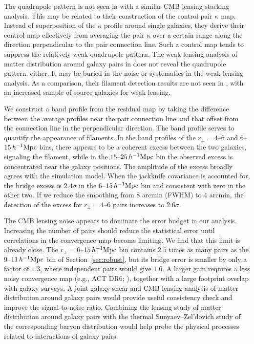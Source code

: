 \documentclass[twocolumn,anonymous,linenumbers]{aastex701}
\newcommand{\hinvMpc}{h^{-1}{\rm Mpc}}
\begin{document}
The quadrupole pattern is not seen in \citet{deGraaff2019} with a similar CMB lensing stacking analysis. This may be related to their construction of the control pair $\kappa$ map. Instead of superposition of the $\kappa$ profile around single galaxies, they derive their control map effectively from averaging the pair $\kappa$ over a certain range along the direction perpendicular to the pair connection line. Such a control map tends to suppress the relatively weak quadrupole pattern. The weak lensing analysis of matter distribution around galaxy pairs in \citet{EppsHudson2017} does not reveal the quadrupole pattern, either. It may be buried in the noise or systematics in the weak lensing analysis. As a comparison, their filament detection results are not seen in \citet{Xia2020}, with an increased sample of source galaxies for weak lensing.

We construct a band profile from the residual map by taking the difference between the average profiles near the pair connection line and that offset from the connection line in the perpendicular direction. The band profile serves to quantify the appearance of filaments. In the band profiles of the $r_\perp=4$--$6$ and $6$--$15\,\hinvMpc$ bins, there appears to be a coherent excess between the two galaxies, signaling the filament, while in the $15$--$25\,\hinvMpc$ bin the observed excess is concentrated near the galaxy positions. The amplitude of the excess broadly agrees with the simulation model. When the jackknife covariance is accounted for, the bridge excess is $2.4\sigma$ in the $6$--$15\,\hinvMpc$ bin and consistent with zero in the other two. If we reduce the smoothing from 8 arcmin (FWHM) to 4 arcmin, the detection of the excess for $r_\perp=4$--$6$ pairs increases to 2.6$\sigma$.

The CMB lensing noise appears to dominate the error budget in our analysis.
Increasing the number of pairs
should reduce the statistical error until correlations in the convergence
map become limiting. We find that this limit is already close. The
$r_\perp=6$--$15\,\hinvMpc$ bin contains $2.5$ times as many pairs as the
$9$--$11\,\hinvMpc$ bin of Section~\ref{sec:robust}, but its bridge error is
smaller by only a factor of $1.3$, where independent pairs would give $1.6$.
A larger gain requires a less noisy convergence map (e.g., ACT DR6; \citealt{ACT2024}), together with a large footprint overlap with galaxy surveys. A joint galaxy-shear and CMB-lensing analysis of matter distribution around galaxy pairs would provide useful consistency check and improve the signal-to-noise ratio. Combining the lensing study of matter distribution around galaxy pairs with the thermal Sunyaev--Zel'dovich study \citep[e.g.,][]{deGraaff2019} of the corresponding baryon distribution would help probe the physical processes related to interactions of galaxy pairs. 
\end{document}
